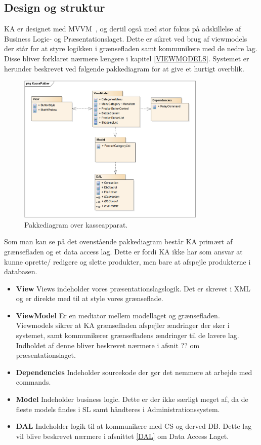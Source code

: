 \subsection{Design og struktur}
\gls{KA} er designet med MVVM~\cite{MVVM}, og dertil også med stor fokus på adskillelse af Business Logic- og Præsentationslaget. Dette er sikret ved brug af viewmodels der står for at styre logikken i grænsefladen samt kommunikere med de nedre lag. Disse bliver forklaret nærmere længere i kapitel \ref{VIEWMODELS}.
Systemet er herunder beskrevet ved følgende pakkediagram for at give et hurtigt overblik.	

\begin{figure}[H]
	\centering
	\includegraphics[width=0.8\textwidth]{Systemdesign/Frontend/pics/KassePakker}
	\caption{Pakkediagram over kasseapparat.}
	\label{fig:EndeligeGUI}
\end{figure}

Som man kan se på det ovenstående pakkediagram består \gls{KA} primært af grænsefladen og et data access lag. Dette er fordi \gls{KA} ikke har som ansvar at kunne oprette/ redigere og slette produkter, men bare at afspejle produkterne i databasen. 

\begin{itemize}
	\item \textbf{View} Views indeholder vores præsentationslagslogik. Det er skrevet i XML og er direkte med til at style vores grænseflade.
	\item \textbf{ViewModel} Er en mediator mellem modellaget og grænsefladen. Viewmodels sikrer at \gls{KA} grænsefladen afspejler ændringer der sker i systemet, samt kommunikerer grænsefladens ændringer til de lavere lag. Indholdet af denne bliver beskrevet nærmere i afsnit ?? om præsentationslaget.
	\item \textbf{Dependencies} Indeholder sourcekode der gør det nemmere at arbejde med commands.
	\item \textbf{Model} Indeholder business logic. Dette er der ikke særligt meget af, da de fleste models findes i \gls{SL} samt håndteres i Administrationssystem.
	\item \textbf{DAL} Indeholder logik til at kommunikere med \gls{CS} og derved \gls{DB}. Dette lag vil blive beskrevet nærmere i afsnittet \ref{DAL} om Data Access Laget.
\end{itemize}



